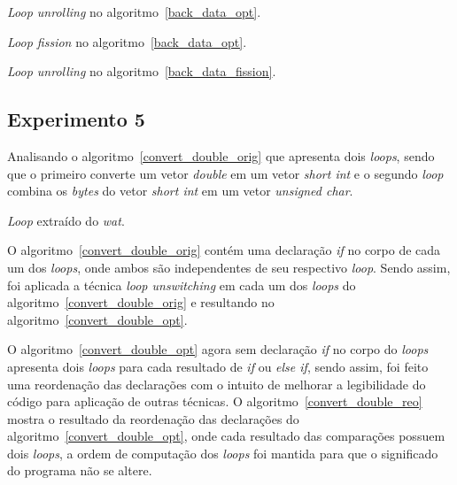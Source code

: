 \begin{algorithm}[H]
\caption{\textit{Loop unrolling} no algoritmo~\ref{back_data_opt}.}
\label{back_data_unroll}

\end{algorithm}

\begin{algorithm}[H]
\caption{\textit{Loop fission} no algoritmo~\ref{back_data_opt}.}
\label{back_data_fission}

\end{algorithm}

\begin{algorithm}[H]
\caption{\textit{Loop unrolling} no algoritmo~\ref{back_data_fission}.}
\label{back_data_unrofis}

\end{algorithm}
\subsection{Experimento 5}

Analisando o algoritmo~\ref{convert_double_orig} que apresenta 
dois \textit{loops},
sendo que o primeiro converte um vetor \textit{double} em um vetor 
\textit{short int} e o segundo \textit{loop} combina os \textit{bytes} do vetor
\textit{short int} em um vetor \textit{unsigned char}.

\begin{algorithm}[H]
  \caption{\textit{Loop} extraído do \textit{wat}.}
\label{convert_double_orig}

\end{algorithm}

O algoritmo~\ref{convert_double_orig} contém uma declaração \textit{if} no corpo de
cada um dos \textit{loops}, onde ambos são independentes de seu respectivo \textit{loop}. 
Sendo assim, foi aplicada a técnica \textit{loop unswitching} em cada um dos
\textit{loops} do algoritmo~\ref{convert_double_orig} e resultando no
algoritmo~\ref{convert_double_opt}.

O algoritmo~\ref{convert_double_opt} agora sem declaração \textit{if} no corpo
do \textit{loops} apresenta dois \textit{loops} para cada resultado de
\textit{if} ou \textit{else if}, sendo assim, foi feito uma reordenação das
declarações com o intuito de melhorar a legibilidade do código para aplicação de
outras técnicas.
O algoritmo~\ref{convert_double_reo} mostra o resultado da reordenação das
declarações do algoritmo~\ref{convert_double_opt}, onde cada resultado das
comparações possuem dois \textit{loops}, a ordem de computação dos
\textit{loops} foi mantida para que o significado do programa não se altere.

